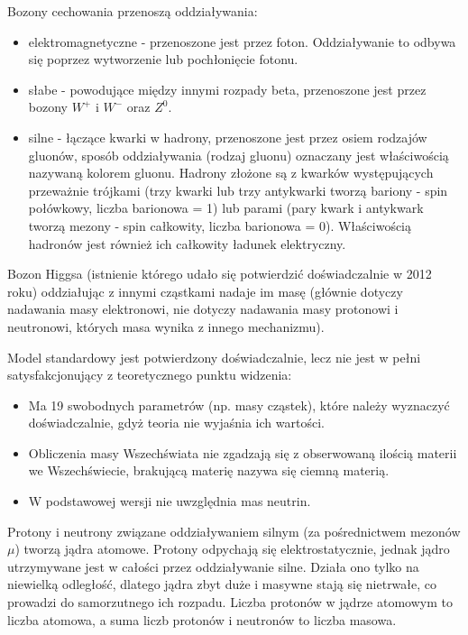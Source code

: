 Bozony cechowania przenoszą oddziaływania:
\begin{itemize}
	\item elektromagnetyczne - przenoszone jest przez foton. Oddziaływanie to odbywa się poprzez wytworzenie lub pochłonięcie fotonu.
	\item słabe - powodujące między innymi rozpady beta, przenoszone jest przez bozony $ W^+ $ i $ W^- $ oraz $ Z^0 $.
	\item silne - łączące kwarki w hadrony, przenoszone jest przez osiem rodzajów gluonów, sposób oddziaływania (rodzaj gluonu) oznaczany jest właściwością nazywaną kolorem gluonu. Hadrony złożone są z kwarków występujących przeważnie trójkami (trzy kwarki lub trzy antykwarki tworzą bariony - spin połówkowy, liczba barionowa = 1) lub parami (pary kwark i antykwark tworzą mezony - spin całkowity, liczba barionowa = 0). Właściwością hadronów jest również ich całkowity ładunek elektryczny.
\end{itemize}

Bozon Higgsa (istnienie którego udało się potwierdzić doświadczalnie w 2012 roku) oddziałując z innymi cząstkami nadaje im masę (głównie dotyczy nadawania masy elektronowi, nie dotyczy nadawania masy protonowi i neutronowi, których masa wynika z innego mechanizmu).

Model standardowy jest potwierdzony doświadczalnie, lecz nie jest w pełni satysfakcjonujący z teoretycznego punktu widzenia:

\begin{itemize}
	\item Ma 19 swobodnych parametrów (np. masy cząstek), które należy wyznaczyć doświadczalnie, gdyż teoria nie wyjaśnia ich wartości.
	\item Obliczenia masy Wszechświata nie zgadzają się z obserwowaną ilością materii we Wszechświecie, brakującą materię nazywa się ciemną materią.
	\item W podstawowej wersji nie uwzględnia mas neutrin.
\end{itemize}

Protony i neutrony związane oddziaływaniem silnym (za pośrednictwem mezonów $ \mu $) tworzą jądra atomowe. Protony odpychają się elektrostatycznie, jednak jądro utrzymywane jest w całości przez oddziaływanie silne. Działa ono tylko na niewielką odległość, dlatego jądra zbyt duże i masywne stają się nietrwałe, co prowadzi do samorzutnego ich rozpadu. Liczba protonów w jądrze atomowym to liczba atomowa, a suma liczb protonów i neutronów to liczba masowa.

